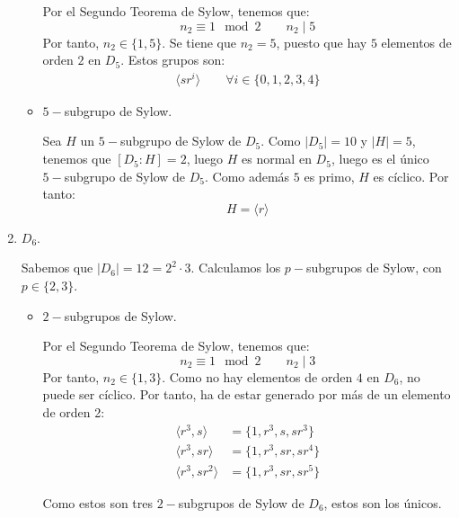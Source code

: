 \begin{ejercicio}
\begin{enumerate}
\begin{itemize}
            Por el Segundo Teorema de Sylow, tenemos que:
            \begin{equation*}
                n_2 \equiv 1 \mod 2 \qquad n_2 \mid 5
            \end{equation*}
            Por tanto, $n_2\in \{1,5\}$. Se tiene que $n_2=5$, puesto que hay $5$ elementos de orden $2$ en $D_5$. Estos grupos son:
            \begin{align*}
                \langle sr^i \rangle \qquad \forall i\in \{0,1,2,3,4\}
            \end{align*}

            \item $5-$subgrupo de Sylow.
            
            Sea $H$ un $5-$subgrupo de Sylow de $D_5$. Como $|D_5|=10$ y $|H|=5$, tenemos que $[D_5:H]=2$, luego $H$ es normal en $D_5$, luego es el único $5-$subgrupo de Sylow de $D_5$. Como además $5$ es primo, $H$ es cíclico. Por tanto:
            \begin{equation*}
                H = \langle r \rangle
            \end{equation*}
        \end{itemize}

        \item $D_6$.
        
        Sabemos que $|D_6|=12=2^2\cdot 3$. Calculamos los $p-$subgrupos de Sylow, con $p\in \{2,3\}$.
        \begin{itemize}
            \item $2-$subgrupos de Sylow.
            
            Por el Segundo Teorema de Sylow, tenemos que:
            \begin{equation*}
                n_2 \equiv 1 \mod 2 \qquad n_2 \mid 3
            \end{equation*}
            Por tanto, $n_2\in \{1,3\}$. Como no hay elementos de orden $4$ en $D_6$, no puede ser cíclico. Por tanto, ha de estar generado por más de un elemento de orden 2:
            \begin{align*}
                \langle r^3,s\rangle &= \{1,r^3,s,sr^3\}\\
                \langle r^3,sr\rangle &= \{1,r^3,sr,sr^4\}\\
                \langle r^3,sr^2\rangle &= \{1,r^3,sr,sr^5\}
            \end{align*}

            Como estos son tres $2-$subgrupos de Sylow de $D_6$, estos son los únicos.



\end{itemize}
\end{enumerate}
\end{ejercicio}
